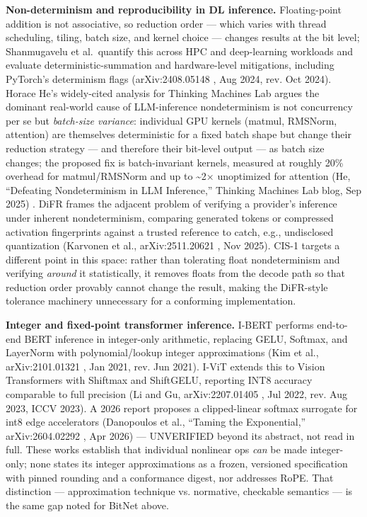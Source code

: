 \documentclass[11pt]{article}
\begin{document}
\textbf{Non-determinism and reproducibility in DL inference.} Floating-point
addition is not associative, so reduction order --- which varies with thread
scheduling, tiling, batch size, and kernel choice --- changes results at the
bit level; Shanmugavelu et al.~quantify this across HPC and deep-learning
workloads and evaluate deterministic-summation and hardware-level
mitigations, including PyTorch's determinism flags (arXiv:2408.05148 \citep{shanmugavelu2024nonassoc}, Aug
2024, rev. Oct 2024). Horace He's widely-cited analysis for Thinking
Machines Lab argues the dominant real-world cause of LLM-inference
nondeterminism is not concurrency per se but \emph{batch-size variance}:
individual GPU kernels (matmul, RMSNorm, attention) are themselves
deterministic for a fixed batch shape but change their reduction strategy ---
and therefore their bit-level output --- as batch size changes; the proposed
fix is batch-invariant kernels, measured at roughly 20\% overhead for
matmul/RMSNorm and up to \textasciitilde2× unoptimized for attention (He, ``Defeating
Nondeterminism in LLM Inference,'' Thinking Machines Lab blog, Sep 2025) \citep{he2025defeating}.
DiFR frames the adjacent problem of verifying a provider's inference under
inherent nondeterminism, comparing generated tokens or compressed
activation fingerprints against a trusted reference to catch, e.g.,
undisclosed quantization (Karvonen et al., arXiv:2511.20621 \citep{karvonen2025difr}, Nov 2025).
CIS-1 targets a different point in this space: rather than tolerating
float nondeterminism and verifying \emph{around} it statistically, it removes
floats from the decode path so that reduction order provably cannot change
the result, making the DiFR-style tolerance machinery unnecessary for a
conforming implementation.

\textbf{Integer and fixed-point transformer inference.} I-BERT performs
end-to-end BERT inference in integer-only arithmetic, replacing GELU,
Softmax, and LayerNorm with polynomial/lookup integer approximations (Kim
et al., arXiv:2101.01321 \citep{kim2021ibert}, Jan 2021, rev. Jun 2021). I-ViT extends this to
Vision Transformers with Shiftmax and ShiftGELU, reporting INT8 accuracy
comparable to full precision (Li and Gu, arXiv:2207.01405 \citep{li2022ivit}, Jul 2022, rev.
Aug 2023, ICCV 2023). A 2026 report proposes a clipped-linear softmax
surrogate for int8 edge accelerators (Danopoulos et al., ``Taming the
Exponential,'' arXiv:2604.02292 \citep{danopoulos2026taming}, Apr 2026) --- UNVERIFIED beyond its abstract,
not read in full. These works establish that individual nonlinear ops
\emph{can} be made integer-only; none states its integer approximations as a
frozen, versioned specification with pinned rounding and a conformance
digest, nor addresses RoPE. That distinction --- approximation technique vs.
normative, checkable semantics --- is the same gap noted for BitNet above.
\end{document}
